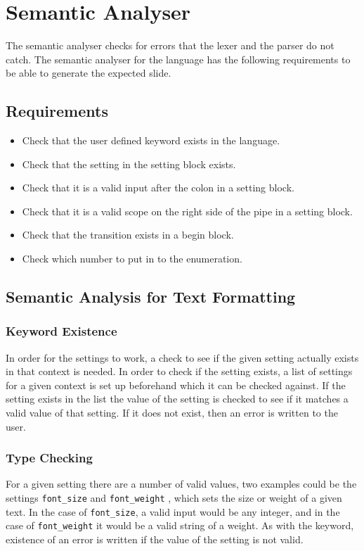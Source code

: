\chapter{Semantic Analyser}

The semantic analyser checks for errors that the lexer and the parser do not catch. The semantic analyser for the language has the following requirements to be able to generate the expected slide.

\section{Requirements}
\begin{itemize}
	\item Check that the user defined keyword exists in the language.
	\item Check that the setting in the setting block exists.
	\item Check that it is a valid input after the colon in a setting block.
	\item Check that it is a valid scope on the right side of the pipe in a setting block.
	\item Check that the transition exists in a begin block.
	\item Check which number to put in to the enumeration.
\end{itemize}


\section{Semantic Analysis for Text Formatting}

\subsection{Keyword Existence}
In order for the settings to work, a check to see if the given setting actually exists in that context is needed. In order to check if the setting exists, a list of settings for a given context is set up beforehand which it can be checked against. If the setting exists in the list the value of the setting is checked to see if it matches a valid value of that setting. If it does not exist, then an error is written to the user.

\subsection{Type Checking}
For a given setting there are a number of valid values, two examples could be the settings \texttt{font\_size} and \texttt{font\_weight} , which sets the size or weight of a given text. In the case of \texttt{font\_size}, a valid input would be any integer, and in the case of \texttt{font\_weight} it would be a valid string of a weight. As with the keyword, existence of an error is written if the value of the setting is not valid.
     
